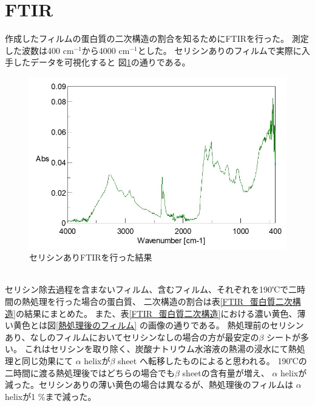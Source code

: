 \documentclass[dvipdfmx,12pt,a4paper]{jreport}
\begin{document}
	\section{FTIR}
	作成したフィルムの蛋白質の二次構造の割合を知るためにFTIRを行った。
	測定した波数は400 cm$^{-1}$から4000 cm$^{-1}$とした。
	セリシンありのフィルムで実際に入手したデータを可視化すると
	図\ref{FTIR_セリシンあり}の通りである。
	\begin{figure}[h]
		\centering
		\includegraphics[scale=0.6]{FTIR_セリシンあり.jpg}
		\caption{セリシンありFTIRを行った結果}
		\label{FTIR_セリシンあり}
	\end{figure}
	\\
	セリシン除去過程を含まないフィルム、含むフィルム、それぞれを190℃で二時間の熱処理を行った場合の蛋白質、
	二次構造の割合は表\ref{FTIR_蛋白質二次構造}の結果にまとめた。
	また、表\ref{FTIR_蛋白質二次構造}における濃い黄色、薄い黄色とは図\ref{熱処理後のフィルム}
	の画像の通りである。
	熱処理前のセリシンあり、なしのフィルムにおいてセリシンなしの場合の方が最安定の$\beta$ シートが多い。
	これはセリシンを取り除く、炭酸ナトリウム水溶液の熱湯の浸水にて熱処理と同じ効果にて
	$\alpha$ helixが$\beta$ sheet へ転移したものによると思われる。
	190℃の二時間に渡る熱処理後ではどちらの場合でも$\beta$ sheetの含有量が増え、
	$\alpha$ helixが減った。セリシンありの薄い黄色の場合は異なるが、熱処理後のフィルムは
	$\alpha$ helixが1 \%まで減った。
\end{document}

